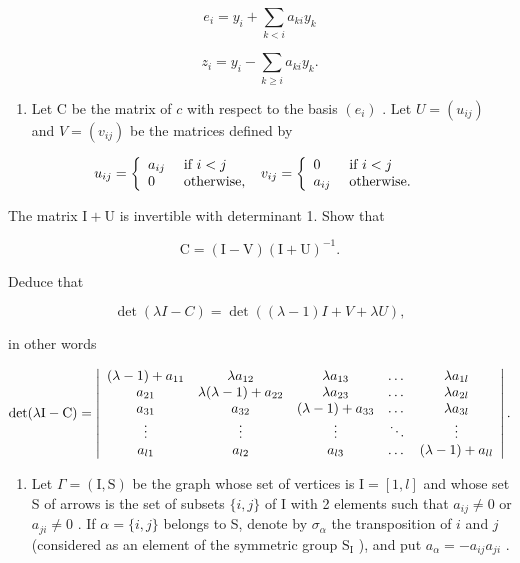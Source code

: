 \[
e _ {i} = y _ {i} + \sum_ {k <   i} a _ {k i} y _ {k}
\]

\[
z _ {i} = y _ {i} - \sum_ {k \geqslant i} a _ {k i} y _ {k}.
\]

\begin{enumerate}
\def\labelenumi{\alph{enumi})}
\setcounter{enumi}{1}
\tightlist
\item
  Let C be the matrix of \(c\) with respect to the basis \((e_i)\) . Let \(U = (u_{ij})\) and \(V = (v_{ij})\) be the matrices defined by
\end{enumerate}

\[
u _ {i j} = \left\{ \begin{array}{l l} a _ {i j} & \text { if } i <   j \\ 0 & \text { otherwise, } \end{array} \right. v _ {i j} = \left\{ \begin{array}{l l} 0 & \text { if } i <   j \\ a _ {i j} & \text { otherwise. } \end{array} \right.
\]

The matrix \(\mathrm{I} + \mathrm{U}\) is invertible with determinant 1. Show that

\[
\mathrm{C} = (\mathrm{I} - \mathrm{V}) (\mathrm{I} + \mathrm{U}) ^ {- 1}.
\]

Deduce that

\[
\det (\lambda I - C) = \det ((\lambda - 1) I + V + \lambda U),
\]

in other words

\[
\det (\lambda \mathrm{I} - \mathrm{C}) = \left| \begin{array}{c c c c c} (\lambda - 1) + a _ {1 1} & \lambda a _ {1 2} & \lambda a _ {1 3} & \dots & \lambda a _ {1 l} \\ a _ {2 1} & \lambda (\lambda - 1) + a _ {2 2} & \lambda a _ {2 3} & \dots & \lambda a _ {2 l} \\ a _ {3 1} & a _ {3 2} & (\lambda - 1) + a _ {3 3} & \dots & \lambda a _ {3 l} \\ \vdots & \vdots & \vdots & \ddots & \vdots \\ a _ {l 1} & a _ {l 2} & a _ {l 3} & \dots & (\lambda - 1) + a _ {l l} \end{array} \right|.
\]

\begin{enumerate}
\def\labelenumi{\alph{enumi})}
\setcounter{enumi}{2}
\tightlist
\item
  Let \(\Gamma = (\mathrm{I},\mathrm{S})\) be the graph whose set of vertices is \(\mathrm{I} = [1,l]\) and whose set S of arrows is the set of subsets \(\{i,j\}\) of I with 2 elements such that \(a_{ij}\neq 0\) or \(a_{ji}\neq 0\) . If \(\alpha = \{i,j\}\) belongs to S, denote by \(\sigma_{\alpha}\) the transposition of \(i\) and \(j\) (considered as an element of the symmetric group \(\mathrm{S_I}\) ), and put \(a_{\alpha} = -a_{ij}a_{ji}\) .
\end{enumerate}


